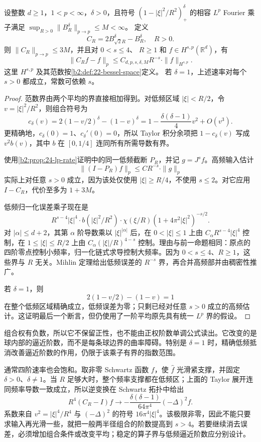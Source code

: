 \begin{proposition}[两半径组合的逼近阶数]\label{b2:prop:24-two-radius-rate}
设整数 \(d\geq1\)，\(1<p<\infty\)，\(\delta>0\)，且符号
\((1-|\xi|^2/R^2)_+^\delta\) 的相容 \(L^p\) Fourier 乘子满足
\(\sup_{R>0}\|B_R^\delta\|_{p\to p}\leq M<\infty\)。
定义
\[
 C_R=2B_{\sqrt2R}^\delta-B_R^\delta,\quad R>0.
\]
则 \(\|C_R\|_{p\to p}\leq3M\)，并且对 \(0<s\leq4\)、
\(R\geq1\) 和 \(f\in H^{s,p}(\mathbb R^d)\)，有
\[
 \|C_Rf-f\|_p
 \leq C_{d,p,s,\delta,M}R^{-s}\cdot\|f\|_{H^{s,p}}.
\]
这里 \(H^{s,p}\) 及其范数按\cref{b2:def:22-bessel-space}定义。
若 \(\delta=1\)，上述速率对每个 \(s>0\) 都成立，常数可依赖 \(s\)。
\end{proposition}
\begin{proof}
范数界由两个平均的界直接相加得到。对低频区域 \(|\xi|<R/2\)，令 \(v=|\xi|^2/R^2\)，则组合符号为
\[
 c_\delta(v)=2(1-v/2)^\delta-(1-v)^\delta
 =1-\frac{\delta(\delta-1)}4v^2+O(v^3).
\]
更精确地，\(c_\delta(0)=1\)、\(c_\delta'(0)=0\)，所以 Taylor 积分余项把 \(1-c_\delta(v)\) 写成
\(v^2b(v)\)，其中 \(b\) 在 \([0,1/4]\) 连同所有所需导数有界。

使用\cref{b2:prop:24-lp-rate}证明中的同一低频截断 \(P_R\)，并记 \(g=J^sf\)。高频输入估计
\[
 \|(I-P_R)f\|_p\leq C R^{-s}\cdot\|g\|_p
\]
实际上对任意 \(s>0\) 成立，因为该处仅使用 \(|\xi|\geq R/4\)，不使用 \(s\leq2\)。对它应用 \(I-C_R\)，代价至多为 \(1+3M\)。

低频归一化误差乘子现在是
\[
 R^{s-4}|\xi|^4\cdot b(|\xi|^2/R^2)\cdot
 \chi(\xi/R)(1+4\pi^2|\xi|^2)^{-s/2}.
\]
对 \(|\alpha|\leq d+2\)，其第 \(\alpha\) 阶导数乘以 \(|\xi|^{|\alpha|}\) 后，在 \(0<|\xi|\leq1\) 上由
\(C_\alpha R^{s-4}|\xi|^4\) 控制，在
\(1\leq|\xi|\leq R/2\) 上由
\(C_\alpha(|\xi|/R)^{4-s}\) 控制。理由与前一命题相同：原点的四阶零点控制小频率，归一化链式求导控制大频率。因为 \(0<s\leq4\)、\(R\geq1\)，这些界与 \(R\) 无关。Mihlin 定理给出低频误差的 \(R^{-s}\) 界，再合并高频部并由稠密性推广。

若 \(\delta=1\)，则
\[
 2(1-v/2)-(1-v)=1
\]
在整个低频区域精确成立，低频误差为零；只剩已经对任意 \(s>0\) 成立的高频估计。这证明最后一个断言，但仍使用了一阶平均原先具有统一 \(L^p\) 界的假设。
\end{proof}

组合权有负数，所以它不保留正性，也不能由正权阶数单调公式读出。它改变的是球内部的逼近阶数，而不是每条球边界的曲率障碍。特别是 \(\delta=1\) 时，精确低频抵消改善逼近阶数的作用，仍限于该乘子有界的指数范围。

\ProseParagraphBreak
通常四阶速率也会饱和。取非零 Schwartz 函数 \(f\)，使 \(\widehat f\) 光滑紧支撑，并固定 \(\delta>0\)、\(\delta\ne1\)。当 \(R\) 足够大时，整个频率支撑都在低频区；上面的 Taylor 展开连同频率导数一致成立，所以逆变换在 Schwartz 拓扑中给出
\[
 R^4(C_R-I)f
 \longrightarrow
 -\frac{\delta(\delta-1)}{64\pi^4}(-\Delta)^2f.
\]
系数来自 \(v^2=|\xi|^4/R^4\) 与
\((-\Delta)^2\) 的符号 \(16\pi^4|\xi|^4\)。该极限非零，因此不能只要求输入再光滑一些，就把一般两半径组合的阶数提高到 \(s>4\)。若要继续消去误差，必须增加组合条件或改变平均；稳定的算子界与低频逼近阶数应分别设计。
